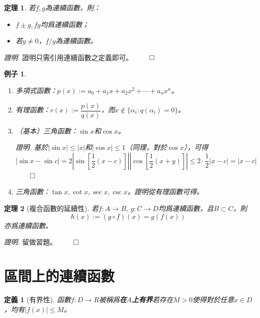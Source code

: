 \documentclass[12pt]{article}
\newtheorem{definition}{定義}
\newtheorem*{theorem}{定理}
\newtheorem*{example}{例子}
\renewenvironment*{proof}{\textit{證明.}}{\hfill$\qed$}
\begin{document}
    \begin{theorem}
        若$f,g$為連續函數，則：\begin{itemize}
            \item $f\pm g, fg$均爲連續函數；
            \item 若$g\neq 0$，$f/g$為連續函數。
        \end{itemize}
    \end{theorem}

    \begin{proof}
        證明只需引用連續函數之定義即可。
    \end{proof}

    \begin{example}
        \begin{enumerate}
            \item 多項式函數：$p(x):=a_0+a_1x+a_2x^2+\cdots +a_nx^n$。
            \item 有理函數：$r(x):=\dfrac{p(x)}{q(x)}$，而$x\notin\{\alpha_i:q(\alpha_i)=0\}$。
            \item （基本）三角函數：$\sin{x}$和$\cos{x}$。

            \begin{proof}
                基於$|\sin{x}|\leq |x|$和$|\cos{x}|\leq 1$（同理，對於$\cos{x}$），可得$$|\sin{x}-\sin{c}|=2|\sin[\frac{1}{2}(x-c)]||\cos[\frac{1}{2}(x+y)]|\leq 2\cdot \frac{1}{2}|x-c|=|x-c|$$
            \end{proof}
            \item 三角函數：$\tan{x},\cot{x},\sec{x},\csc{x}$。證明從有理函數可得。
        \end{enumerate}
    \end{example}

    \begin{theorem}[複合函數的延續性]
        若$f:A\to B$, $g:C\to D$均爲連續函數，且$B\subset C$，則$$h(x):=(g\circ f)(x)=g(f(x))$$亦爲連續函數。
    \end{theorem}

    \begin{proof}
        留做習題。
    \end{proof}
    \section*{區間上的連續函數}
    
    \begin{definition}[有界性]
        函數$f:D\to R$被稱爲\textbf{在$A$上有界}若存在$M>0$使得對於任意$x\in D$，均有$|f(x)|\leq M$。
    \end{definition}
\end{document}
